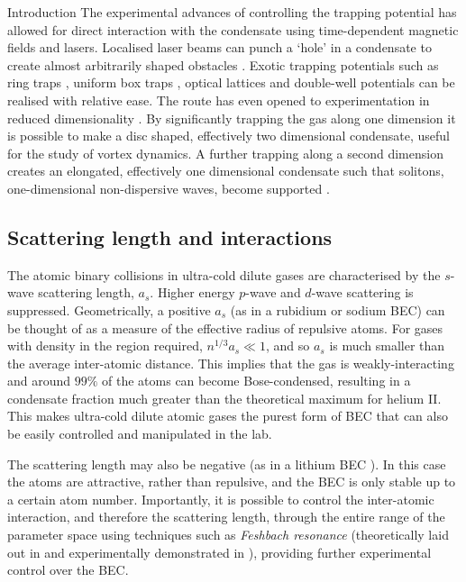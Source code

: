 \begin{chapter}{\label{cha:bose_gases}Introduction}
The experimental advances of controlling the trapping potential has allowed for direct interaction with the condensate using time-dependent magnetic fields and lasers. Localised laser beams can punch a `hole' in a condensate to create almost arbitrarily shaped obstacles \cite{Henderson09}. Exotic trapping potentials such as ring traps \cite{persistent,Ramanathan11}, uniform box traps \cite{gaunt_2013,chomaz_2015}, optical lattices \cite{Greiner02} and double-well \cite{PhysRevLett.106.025302} potentials can be realised with relative ease. The route has even opened to experimentation in reduced dimensionality \cite{Gorlitz,PhysRevLett.87.080403,PhysRevLett.91.250402,PhysRevLett.92.173003}. By significantly trapping the gas along one dimension it is possible to make a disc shaped, effectively two dimensional condensate, useful \cite{Neely,Freilich2010} for the study of vortex dynamics. A further trapping along a second dimension creates an elongated, effectively one dimensional condensate such that solitons, one-dimensional non-dispersive waves, become supported \cite{drazin1989solitons,PhysRevLett.101.120406}.

\subsection{Scattering length and interactions}
The atomic binary collisions in ultra-cold dilute gases are characterised by the $s$-wave scattering length, $a_s$. Higher energy $p$-wave and $d$-wave scattering is suppressed. Geometrically, a positive $a_s$ (as in a rubidium or sodium BEC) can be thought of as a measure of the effective radius of repulsive atoms. For gases with density in the region required, $n^{1/3}a_s \ll 1$, and so $a_s$ is much smaller than the average inter-atomic distance. This implies that the gas is weakly-interacting and around $99\%$ of the atoms can become Bose-condensed, resulting in a condensate fraction much greater than the theoretical maximum for helium II. This makes ultra-cold dilute atomic gases the purest form of BEC that can also be easily controlled and manipulated in the lab.

The scattering length may also be negative (as in a lithium BEC \cite{PhysRevLett.75.1687, PhysRevLett.78.985}). In this case the atoms are attractive, rather than repulsive, and the BEC is only stable up to a certain atom number. Importantly, it is possible to control the inter-atomic interaction, and therefore the scattering length, through the entire range of the parameter space using techniques such as {\it Feshbach resonance} (theoretically laid out in \cite{weiner2003cold} and experimentally demonstrated in \cite{Inouye1998,PhysRevLett.82.2422,PhysRevLett.85.1795}), providing further experimental control over the BEC.


\end{chapter}

